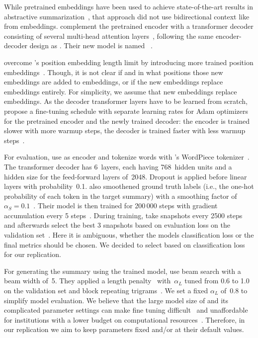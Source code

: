 While pretrained \Elmo embeddings have been used to achieve state-of-the-art results in abstractive summarization~\cite{EdunovBA2019}, that approach did not use bidirectional context like from \Bert embeddings. 
\citeauthor{LiuL2019} complement the pretrained \Bert encoder with a transformer decoder consisting of several multi-head attention layers~\cite{LiuL2019,DevlinCLT2019,VaswaniSPUJGKP2017}, following the same encoder-decoder design as \textcite{SeeLM2017}. Their new model is named \BertSumAbs~\cite{LiuL2019}.

\citeauthor{LiuL2019} overcome \Bert's position embedding length limit by introducing more trained position embeddings~\cite{LiuL2019}. Though, it is not clear if and in what positions those new embeddings are added to \Bert embeddings, or if the new embeddings replace \Bert embeddings entirely. For simplicity, we assume that new embeddings replace \Bert embeddings.
As the decoder transformer layers have to be learned from scratch, \citeauthor{LiuL2019} propose a fine-tuning schedule with separate learning rates for Adam optimizers for the pretrained \Bert encoder and the newly trained decoder: the encoder is trained slower with more warmup steps, the decoder is trained faster with less warmup steps~\cite{LiuL2019}.

For evaluation, \citeauthor{LiuL2019} use \BertBase as encoder and tokenize words with \Bert's WordPiece tokenizer~\cite{LiuL2019}.
The transformer decoder has 6~layers, each having 768~hidden units and a hidden size for the feed-forward layers of~2048. Dropout is applied before linear layers with probability~0.1.
\citeauthor{LiuL2019} also smoothened ground truth labels (i.e., the one-hot probability of each token in the target summary) with a smoothing factor of~\(\alpha_S = 0.1\)~\cite{LiuL2019,SzegedyVISW2016}.
Their model is then trained for 200\,000 steps with gradient accumulation every 5 steps~\cite{LiuL2019}.
During training, \citeauthor{LiuL2019} take snapshots every 2500 steps and afterwards select the best 3 snapshots based on evaluation loss on the validation set~\cite{LiuL2019}.
Here it is ambiguous, whether the models classification loss or the final \Rouge metrics should be chosen. We decided to select based on classification loss for our replication.

For generating the summary using the trained model, \citeauthor{LiuL2019} use beam search with a beam width of~5. They applied a length penalty~\cite{WuSCLNMKCGMKSJL2016} with~\(\alpha_L\) tuned from 0.6 to 1.0 on the validation set and block repeating trigrams~\cite{PaulusXS2018}.
We set a fixed \(\alpha_L\) of~0.8 to simplify model evaluation.
We believe that the large model size of \BertSumAbs and its complicated parameter settings can make fine tuning difficult~\cite{AghajanyanSGGZG2020} and unaffordable for institutions with a lower budget on computational resources~\cite{JiaoYSJCL0L2020}.
Therefore, in our replication we aim to keep parameters fixed and/or at their default values.
